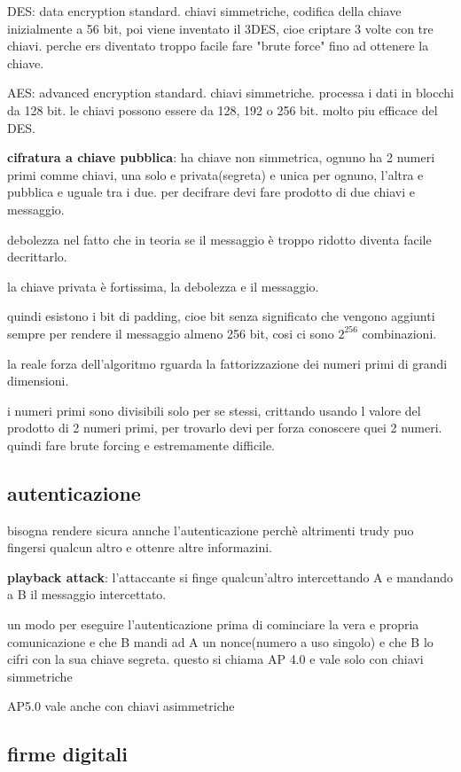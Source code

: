 \documentclass[12pt]{article}
\begin{document}
DES: data encryption standard. chiavi simmetriche, codifica della chiave inizialmente a 56 bit, poi viene inventato il 3DES, cioe criptare 3 volte con tre chiavi. perche ers diventato troppo facile fare "brute force" fino ad ottenere la chiave.

AES: advanced encryption standard. chiavi simmetriche. processa i dati in blocchi da 128 bit. le chiavi possono essere da 128, 192 o 256 bit. molto piu efficace del DES.

\textbf{cifratura a chiave pubblica}: ha chiave non simmetrica, ognuno ha 2 numeri primi comme chiavi, una solo e privata(segreta) e unica per ognuno, l'altra e pubblica e uguale tra i due. per decifrare devi fare prodotto di due chiavi e messaggio.

debolezza nel fatto che in teoria se il messaggio è troppo ridotto diventa facile decrittarlo.

la chiave privata è fortissima, la debolezza e il messaggio.

quindi esistono i bit di padding, cioe bit senza significato che vengono aggiunti sempre per rendere il messaggio almeno 256 bit, cosi ci sono $2^256$ combinazioni.

la reale forza dell'algoritmo rguarda la fattorizzazione dei numeri primi di grandi dimensioni.

i numeri primi sono divisibili solo per se stessi, crittando usando l valore del prodotto di 2 numeri primi, per trovarlo devi per forza conoscere quei 2 numeri.
quindi fare brute forcing e estremamente difficile.

\subsection{autenticazione}

bisogna rendere sicura annche l'autenticazione perchè altrimenti trudy puo fingersi qualcun altro e ottenre altre informazini.

\textbf{playback attack}: l'attaccante si finge qualcun'altro intercettando A e mandando a B il messaggio intercettato.

un modo per eseguire l'autenticazione prima di cominciare la vera e propria comunicazione e che B mandi ad A un nonce(numero a uso singolo) e che B lo cifri con la sua chiave segreta. questo si chiama AP 4.0 e vale solo con chiavi simmetriche

AP5.0 vale anche con chiavi asimmetriche

\subsection{firme digitali}
\end{document}
